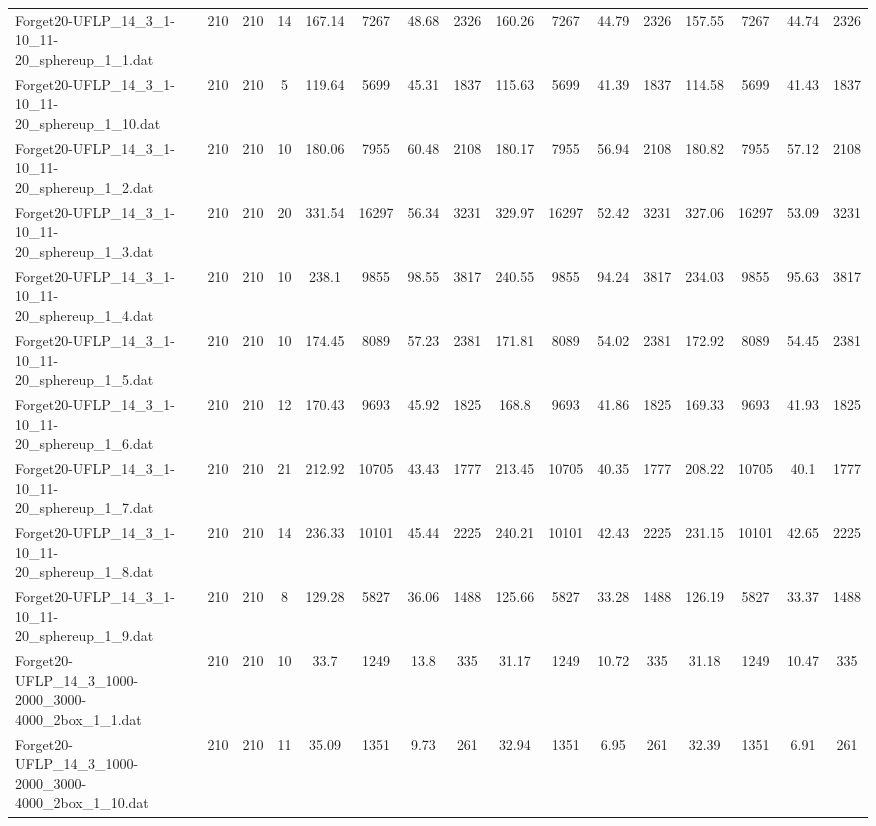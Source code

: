\begin{sidewaystable}[!ht]
{\begin{tabular}{lccccccccccccccc}
Forget20-UFLP\_14\_3\_1-10\_11-20\_sphereup\_1\_1.dat & 210 & 210 & 14 & 167.14 & 7267 & 48.68 & 2326 & 160.26 & 7267 & 44.79 & 2326 & 157.55 & 7267 &  \textcolor{blue2}{44.74} & 2326 \\
Forget20-UFLP\_14\_3\_1-10\_11-20\_sphereup\_1\_10.dat & 210 & 210 & 5 & 119.64 & 5699 & 45.31 & 1837 & 115.63 & 5699 &  \textcolor{blue2}{41.39} & 1837 & 114.58 & 5699 & 41.43 & 1837 \\
Forget20-UFLP\_14\_3\_1-10\_11-20\_sphereup\_1\_2.dat & 210 & 210 & 10 & 180.06 & 7955 & 60.48 & 2108 & 180.17 & 7955 &  \textcolor{blue2}{56.94} & 2108 & 180.82 & 7955 & 57.12 & 2108 \\
Forget20-UFLP\_14\_3\_1-10\_11-20\_sphereup\_1\_3.dat & 210 & 210 & 20 & 331.54 & 16297 & 56.34 & 3231 & 329.97 & 16297 &  \textcolor{blue2}{52.42} & 3231 & 327.06 & 16297 & 53.09 & 3231 \\
Forget20-UFLP\_14\_3\_1-10\_11-20\_sphereup\_1\_4.dat & 210 & 210 & 10 & 238.1 & 9855 & 98.55 & 3817 & 240.55 & 9855 &  \textcolor{blue2}{94.24} & 3817 & 234.03 & 9855 & 95.63 & 3817 \\
Forget20-UFLP\_14\_3\_1-10\_11-20\_sphereup\_1\_5.dat & 210 & 210 & 10 & 174.45 & 8089 & 57.23 & 2381 & 171.81 & 8089 &  \textcolor{blue2}{54.02} & 2381 & 172.92 & 8089 & 54.45 & 2381 \\
Forget20-UFLP\_14\_3\_1-10\_11-20\_sphereup\_1\_6.dat & 210 & 210 & 12 & 170.43 & 9693 & 45.92 & 1825 & 168.8 & 9693 &  \textcolor{blue2}{41.86} & 1825 & 169.33 & 9693 & 41.93 & 1825 \\
Forget20-UFLP\_14\_3\_1-10\_11-20\_sphereup\_1\_7.dat & 210 & 210 & 21 & 212.92 & 10705 & 43.43 & 1777 & 213.45 & 10705 & 40.35 & 1777 & 208.22 & 10705 &  \textcolor{blue2}{40.1} & 1777 \\
Forget20-UFLP\_14\_3\_1-10\_11-20\_sphereup\_1\_8.dat & 210 & 210 & 14 & 236.33 & 10101 & 45.44 & 2225 & 240.21 & 10101 & 42.43 & 2225 & 231.15 & 10101 & 42.65 & 2225 \\
Forget20-UFLP\_14\_3\_1-10\_11-20\_sphereup\_1\_9.dat & 210 & 210 & 8 & 129.28 & 5827 & 36.06 & 1488 & 125.66 & 5827 &  \textcolor{blue2}{33.28} & 1488 & 126.19 & 5827 & 33.37 & 1488 \\
Forget20-UFLP\_14\_3\_1000-2000\_3000-4000\_2box\_1\_1.dat & 210 & 210 & 10 & 33.7 & 1249 & 13.8 & 335 & 31.17 & 1249 & 10.72 & 335 & 31.18 & 1249 & 10.47 & 335 \\
Forget20-UFLP\_14\_3\_1000-2000\_3000-4000\_2box\_1\_10.dat & 210 & 210 & 11 & 35.09 & 1351 & 9.73 & 261 & 32.94 & 1351 & 6.95 & 261 & 32.39 & 1351 & 6.91 & 261 \\

\end{tabular}}
\end{sidewaystable}
